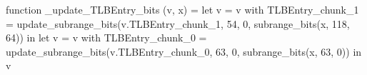 function _update_TLBEntry_bits (v, x) = let v = { v with TLBEntry_chunk_1 = update_subrange_bits(v.TLBEntry_chunk_1, 54, 0, subrange_bits(x, 118, 64)) } in
  let v = { v with TLBEntry_chunk_0 = update_subrange_bits(v.TLBEntry_chunk_0, 63, 0, subrange_bits(x, 63, 0)) } in v
